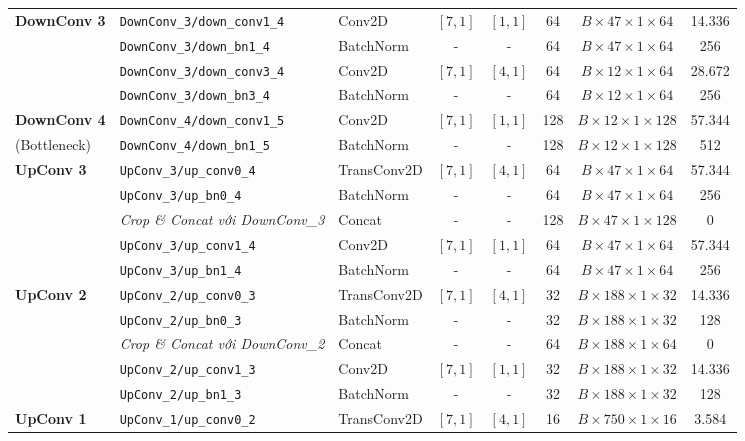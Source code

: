 \documentclass[preprint,1p]{elsarticle}
\begin{document}
\begin{table}[htbp]
\begin{tabular}{lllccccc}
\midrule
\textbf{DownConv 3} & \texttt{DownConv\_3/down\_conv1\_4} & Conv2D & $[7, 1]$ & $[1, 1]$ & 64 & $B \times 47 \times 1 \times 64$ & 14.336 \\
& \texttt{DownConv\_3/down\_bn1\_4} & BatchNorm & - & - & 64 & $B \times 47 \times 1 \times 64$ & 256 \\
& \texttt{DownConv\_3/down\_conv3\_4} & Conv2D & $[7, 1]$ & $[4, 1]$ & 64 & $B \times 12 \times 1 \times 64$ & 28.672 \\
& \texttt{DownConv\_3/down\_bn3\_4} & BatchNorm & - & - & 64 & $B \times 12 \times 1 \times 64$ & 256 \\
\midrule
\textbf{DownConv 4} & \texttt{DownConv\_4/down\_conv1\_5} & Conv2D & $[7, 1]$ & $[1, 1]$ & 128 & $B \times 12 \times 1 \times 128$ & 57.344 \\
(Bottleneck) & \texttt{DownConv\_4/down\_bn1\_5} & BatchNorm & - & - & 128 & $B \times 12 \times 1 \times 128$ & 512 \\
\midrule
\textbf{UpConv 3} & \texttt{UpConv\_3/up\_conv0\_4} & TransConv2D & $[7, 1]$ & $[4, 1]$ & 64 & $B \times 47 \times 1 \times 64$ & 57.344 \\
& \texttt{UpConv\_3/up\_bn0\_4} & BatchNorm & - & - & 64 & $B \times 47 \times 1 \times 64$ & 256 \\
& \textit{Crop \& Concat với DownConv\_3} & Concat & - & - & 128 & $B \times 47 \times 1 \times 128$ & 0 \\
& \texttt{UpConv\_3/up\_conv1\_4} & Conv2D & $[7, 1]$ & $[1, 1]$ & 64 & $B \times 47 \times 1 \times 64$ & 57.344 \\
& \texttt{UpConv\_3/up\_bn1\_4} & BatchNorm & - & - & 64 & $B \times 47 \times 1 \times 64$ & 256 \\
\midrule
\textbf{UpConv 2} & \texttt{UpConv\_2/up\_conv0\_3} & TransConv2D & $[7, 1]$ & $[4, 1]$ & 32 & $B \times 188 \times 1 \times 32$ & 14.336 \\
& \texttt{UpConv\_2/up\_bn0\_3} & BatchNorm & - & - & 32 & $B \times 188 \times 1 \times 32$ & 128 \\
& \textit{Crop \& Concat với DownConv\_2} & Concat & - & - & 64 & $B \times 188 \times 1 \times 64$ & 0 \\
& \texttt{UpConv\_2/up\_conv1\_3} & Conv2D & $[7, 1]$ & $[1, 1]$ & 32 & $B \times 188 \times 1 \times 32$ & 14.336 \\
& \texttt{UpConv\_2/up\_bn1\_3} & BatchNorm & - & - & 32 & $B \times 188 \times 1 \times 32$ & 128 \\
\midrule
\textbf{UpConv 1} & \texttt{UpConv\_1/up\_conv0\_2} & TransConv2D & $[7, 1]$ & $[4, 1]$ & 16 & $B \times 750 \times 1 \times 16$ & 3.584 \\

\end{tabular}
\end{table}
\end{document}
